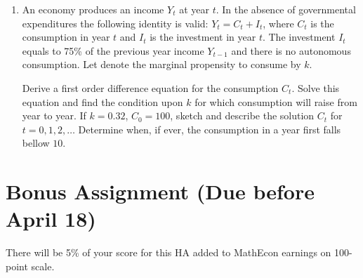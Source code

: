 \documentclass[12pt]{article} %
\theoremstyle{definition} %
\begin{document}
\begin{enumerate}
\item An economy produces an income $Y_t$ at year $t$. In the absence of governmental expenditures
the following identity is valid: $Y_t = C_t + I_t$, where $C_t$ is the consumption in year $t$ and $I_t$ is
the investment in year $t$. 
The investment $I_t$ equals to 75\% of the previous year income $Y_{t-1}$
and there is no autonomous consumption. 
Let denote the marginal propensity to consume by $k$.

Derive a first order difference equation for the consumption $C_t$. 
Solve this equation and find the condition upon $k$ for which consumption will raise from year to year. 
If $k = 0.32$, $C_0 = 100$, sketch and describe the solution $C_t$ for $t = 0, 1, 2, \ldots$ 
Determine when, if ever, the consumption in a year first falls bellow $10$.
\end{enumerate}





\section*{Bonus Assignment (Due before April 18)}


There will be 5\% of your score for this HA added to MathEcon earnings on 100-point scale.

\medskip
\end{document}
